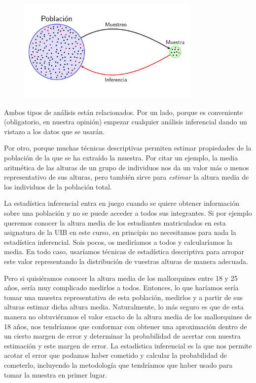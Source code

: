 \documentclass[
  letterpaper,
  DIV=11,
  numbers=noendperiod]{scrreprt}
\begin{document}
\begin{figure}

{\centering \includegraphics[width=0.8\textwidth,height=\textheight]{Figuras/EstInf.png}

}

\end{figure}

Ambos tipos de análisis están relacionados. Por un lado, porque es
conveniente (obligatorio, en nuestra opinión) empezar cualquier análisis
inferencial dando un vistazo a los datos que se usarán.

Por otro, porque muchas técnicas descriptivas permiten estimar
propiedades de la población de la que se ha extraído la muestra. Por
citar un ejemplo, la media aritmética de las alturas de un grupo de
individuos nos da un valor más o menos representativo de sus alturas,
pero también sirve para \emph{estimar} la altura media de los individuos
de la población total.

La estadística inferencial entra en juego cuando se quiere obtener
información sobre una población y no se puede acceder a todos sus
integrantes. Si por ejemplo queremos conocer la altura media de los
estudiantes matriculados en esta asignatura de la UIB en este curso, en
principio no necesitamos para nada la estadística inferencial. Sois
pocos, os mediríamos a todos y calcularíamos la media. En todo caso,
usaríamos técnicas de estadística descriptiva para arropar este valor
representando la distribución de vuestras alturas de manera adecuada.

Pero si quisiéramos conocer la altura media de los mallorquines entre 18
y 25 años, sería muy complicado medirlos a todos. Entonces, lo que
haríamos sería tomar una muestra representativa de esta población,
medirlos y a partir de sus alturas estimar dicha altura media.
Naturalmente, lo más seguro es que de esta manera no obtuviéramos el
valor exacto de la altura media de los mallorquines de 18 años, nos
tendríamos que conformar con obtener una aproximación dentro de un
cierto margen de error y determinar la probabilidad de acertar con
nuestra estimación y este margen de error. La estadística inferencial es
la que nos permite acotar el error que podamos haber cometido y calcular
la probabilidad de cometerlo, incluyendo la metodología que tendríamos
que haber usado para tomar la muestra en primer lugar.
\end{document}
